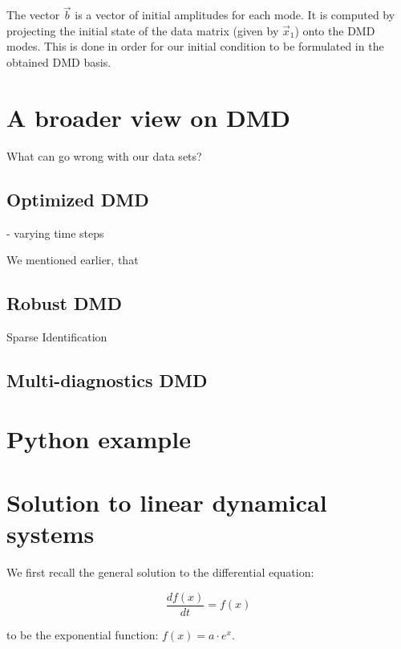 \documentclass[10pt,twocolumn]{article}
\begin{document}
The vector $\vec{b}$ is a vector of initial amplitudes for each mode. It is computed by projecting the initial state of the data matrix (given by $\vec{x}_1$) onto the DMD modes. This is done in order for our initial condition to be formulated in the obtained DMD basis.



\section{A broader view on DMD} \label{sec:view}

What can go wrong with our data sets?

\subsection{Optimized DMD}

- varying time steps

We mentioned earlier, that 

\subsection{Robust DMD}



Sparse Identification




\subsection{Multi-diagnostics DMD}

\section{Python example}



\appendix

\section{Solution to linear dynamical systems} \label{app:A}

We first recall the general solution to the differential equation:

\begin{equation} \label{eq:DE_exp}
\frac{d f(x)}{dt} = f(x)
\end{equation}

to be the exponential function: $f(x) = a \cdot e^{x}$.
\end{document}
